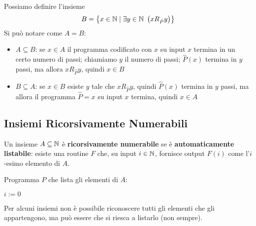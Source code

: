 Possiamo definire l'insieme
$$ B = \left\{x \in \N \mid \exists y \in \N \ \left(xR_{\hat{P}}y\right)\right\} $$
Si può notare come $A = B$:
\begin{itemize}
	\item $A \subseteq B$: se $x \in A$ il programma codificato con $x$ su input $x$ termina in un certo numero di passi; chiamiamo $y$ il numero di passi; $\hat{P}(x)$ termina in $y$ passi, ma allora $xR_{\hat{P}} y$, quindi $x \in B$
	\item $B \subseteq A$: se $x \in B$ esiste $y$ tale che $xR_{\hat{P}}y$, quindi $\hat{P}(x)$ termina in $y$ passi, ma allora il programma $\hat{P} = x$ su input $x$ termina, quindi $x \in A$
\end{itemize}

\subsection{Insiemi Ricorsivamente Numerabili}

Un insieme $A \subseteq \mathbb{N}$ è \textbf{ricorsivamente numerabile} se è \textbf{automaticamente listabile}: esiste una routine $F$ che, su input $i \in \mathbb{N}$, fornisce output $F(i)$ come l'$i$-esimo elemento di $A$.

Programma $P$ che lista gli elementi di $A$:

\vspace{0.5em}
\hspace{4em}
\begin{minipage}{.3\textwidth}
	\begin{tcolorbox}[
		colback=white,
		sharp corners,
		boxrule=.3mm,
		left=20pt
		]
		\begin{algorithm}[H]
			\SetAlgoNoEnd
			$i:=0$ \\
		\end{algorithm}
	\end{tcolorbox}
\end{minipage}
\hspace{2em}
\begin{minipage}{.55\textwidth}
	Per alcuni insiemi non è possibile riconoscere tutti gli elementi che gli appartengono, ma può essere che si riesca a listarlo (non sempre).
\end{minipage}
\vspace{0.1em}

